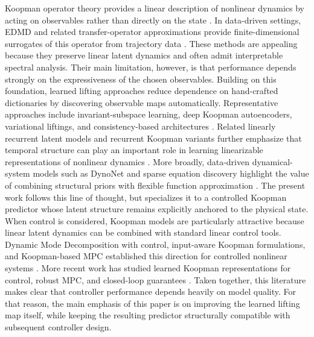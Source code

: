 \documentclass[journal]{IEEEtran}
\begin{document}
Koopman operator theory provides a linear description of nonlinear dynamics by acting on observables rather than directly on the state \cite{koopman1931hamiltonian, koopman1932spectra, mezic2005spectral, rowley2009spectral}. In data-driven settings, EDMD and related transfer-operator approximations provide finite-dimensional surrogates of this operator from trajectory data \cite{williams2015data, williams2015kernel, klus2018data}. These methods are appealing because they preserve linear latent dynamics and often admit interpretable spectral analysis. Their main limitation, however, is that performance depends strongly on the expressiveness of the chosen observables. Building on this foundation, learned lifting approaches reduce dependence on hand-crafted dictionaries by discovering observable maps automatically. Representative approaches include invariant-subspace learning, deep Koopman autoencoders, variational liftings, and consistency-based architectures \cite{takeishi2017koopman, yeung2019learning, lusch2018deep, morton2019deep, azencot2020forecasting, yuan2022variational}. Related linearly recurrent latent models and recurrent Koopman variants further emphasize that temporal structure can play an important role in learning linearizable representations of nonlinear dynamics \cite{otto2019linearly, rank2019recurrent}. More broadly, data-driven dynamical-system models such as DynoNet and sparse equation discovery highlight the value of combining structural priors with flexible function approximation \cite{forgione2021dynonet, brunton2016sindy}. The present work follows this line of thought, but specializes it to a controlled Koopman predictor whose latent structure remains explicitly anchored to the physical state. When control is considered, Koopman models are particularly attractive because linear latent dynamics can be combined with standard linear control tools. Dynamic Mode Decomposition with control, input-aware Koopman formulations, and Koopman-based MPC established this direction for controlled nonlinear systems \cite{proctor2016dmdc, proctor2018generalizing, brunton2016invariant, korda2018linear}. More recent work has studied learned Koopman representations for control, robust MPC, and closed-loop guarantees \cite{han2020deep, shi2022deep, strasser2026overview, duran2025control}. Taken together, this literature makes clear that controller performance depends heavily on model quality. For that reason, the main emphasis of this paper is on improving the learned lifting map itself, while keeping the resulting predictor structurally compatible with subsequent controller design.
\end{document}
